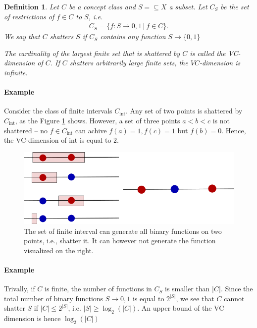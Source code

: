 \documentclass{article}
\newcommand{\sse}{\subseteq}
\newtheorem{defi}{Definition}
\newcommand{\abs}[1]{\vert #1 \vert}
\begin{document}
\begin{defi}
    Let $C$ be a concept class and $S=\sse X$ a subset. Let $C_S$ be the set of restrictions of $f\in C$ to $S$, i.e.
    \begin{align*}
        C_S = \{f:S \to {0,1} \, \vert \ f\in C\}.
    \end{align*}
    We say that $C$ \emph{shatters} $S$ if $C_S$ contains any function $S\to \{0,1\}$

    The cardinality of the largest finite set that is shattered by $C$ is called the \emph{VC-dimension} of $C$. If $C$ shatters arbitrarily large finite sets, the $VC$-dimension is infinite.
\end{defi}

\paragraph{Example} Consider the class of finite intervals $C_{\mathrm{int}}$. Any set of two points is shattered by $C_{\mathrm{int}}$, as the Figure \ref{fig:vcinterval} shows. However, a set of three points $a<b<c$ is not shattered -- no $f\in C_{\mathrm{int}}$ can achive $f(a)=1, f(c)=1$ but $f(b)=0$. Hence, the VC-dimension of ${\mathrm{int}}$ is equal to $2$.

\begin{figure}
    \centering
    \includegraphics[width=0.6\linewidth]{graphics/VC_INTERVAL.png}
    \caption{The set of finite interval can generate all binary functions on two points, i.e., shatter it. It can however not generate the function visualized on the right.}
    \label{fig:vcinterval}
\end{figure}

\paragraph{Example} Trivally, if $C$ is finite, the number of functions in $C_S$ is smaller than $\abs{C}$. Since the total number of binary functions $S\to {0,1}$ is equal to $2^{\abs{S}}$, we see that $C$ cannot shatter $S$ if $\abs{C}\leq 2^{\abs{S}}$, i.e. $\abs{S}\geq \log_2(\abs{C})$. An upper bound of the VC dimension is hence $\log_2(\abs{C})$
\end{document}
